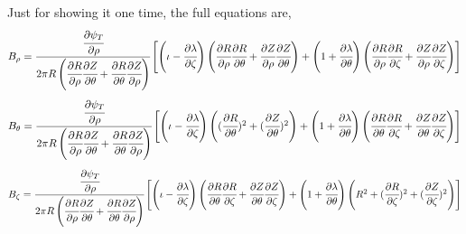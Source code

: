 Just for showing it one time, the full equations are,
\begin{equation}
    B_\rho = \cfrac{\dFluxRho}{2\pi\Jacobian}\begin{bmatrix}
        \left(\iota - \dLz\right) \left(\dRr \dRt + \dZr \dZt \right) + \left(1 + \dLt\right) \left(\dRr \dRz + \dZr \dZz \right)
    \end{bmatrix}
\end{equation}
\begin{equation}
    B_\theta = \cfrac{\dFluxRho}{2\pi\Jacobian}\begin{bmatrix}
        \left(\iota - \dLz\right) \left((\dRt)^2 + (\dZt)^2 \right) + \left(1 + \dLt\right) \left(\dRt \dRz + \dZt \dZz \right)
    \end{bmatrix}
\end{equation}
\begin{equation}
    B_\zeta = \cfrac{\dFluxRho}{2\pi\Jacobian}\begin{bmatrix}
        \left(\iota - \dLz\right) \left(\dRt \dRz + \dZt \dZz \right) + \left(1 + \dLt\right) \left(R^2 + (\dRz)^2 + (\dZz)^2 \right)
    \end{bmatrix}
\end{equation}

